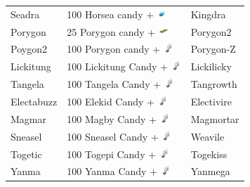 \begin{table}
\begin{tabular}{lll}
    Seadra & 100 Horsea candy + \includegraphics[width=1em,height=1em]{images/dragonscale.png} & Kingdra \\
    Porygon & 25 Porygon candy + \includegraphics[width=1em,height=1em]{images/upgrade.png} & Porygon2 \\
    Poygon2 & 100 Porygon candy + \includegraphics[width=1em,height=1em]{images/sinnohstone.png} & Porygon-Z \\
    Lickitung & 100 Lickitung Candy + \includegraphics[width=1em,height=1em]{images/sinnohstone.png} & Lickilicky \\
    Tangela	& 100 Tangela Candy + \includegraphics[width=1em,height=1em]{images/sinnohstone.png} & Tangrowth \\
    Electabuzz & 100 Elekid Candy + \includegraphics[width=1em,height=1em]{images/sinnohstone.png} & Electivire	\\
    Magmar & 100 Magby Candy + \includegraphics[width=1em,height=1em]{images/sinnohstone.png} & Magmortar	\\
    Sneasel & 100 Sneasel Candy + \includegraphics[width=1em,height=1em]{images/sinnohstone.png} & Weavile	\\
    Togetic & 100 Togepi Candy + \includegraphics[width=1em,height=1em]{images/sinnohstone.png} & Togekiss	\\
    Yanma & 100 Yanma Candy + \includegraphics[width=1em,height=1em]{images/sinnohstone.png} & Yanmega	\\

\end{tabular}
\end{table}
